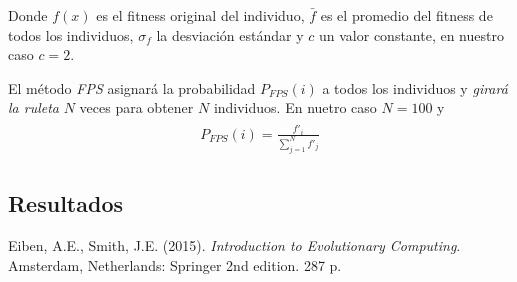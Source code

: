 \documentclass[10pt,letterpaper]{article}
\begin{document}
Donde $f(x)$ es el fitness original del individuo, $\bar{f}$ es el promedio del fitness
de todos los individuos, $\sigma_f$ la desviación estándar y $c$ un valor constante,
en nuestro caso $c=2$.

El método \textit{FPS} asignará la probabilidad $P_{FPS}(i)$ a todos los individuos
y \textit{girará la ruleta} $N$ veces para obtener $N$ individuos. En nuetro caso
$N=100$ y
    \begin{equation*} \begin{split} \begin{gathered}
        P_{FPS}(i) = \frac{f'_i}{\sum_{j=1}^{N} f'_j}
    \end{gathered} \end{split} \end{equation*}

\subsection{Resultados}


\clearpage
\begin{thebibliography}{9}

      Eiben, A.E., Smith, J.E. (2015).
      \textit{Introduction to Evolutionary Computing}.
      Amsterdam, Netherlands: Springer 
      2nd edition. 287 p.
\end{thebibliography}
\end{document}
